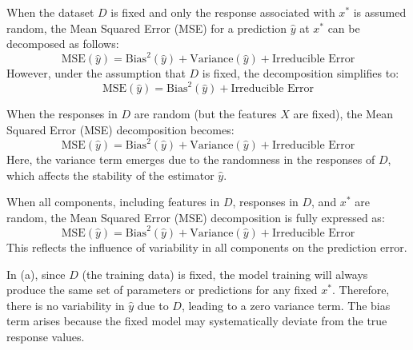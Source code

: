 \documentclass[12pt]{article}
\begin{document}
\begin{enumerate}

When the dataset \(D\) is fixed and only the response associated with \(x^*\) is assumed random, the Mean Squared Error (MSE) for a prediction \(\hat{y}\) at \(x^*\) can be decomposed as follows:
\[
\text{MSE}(\hat{y}) = \text{Bias}^2(\hat{y}) + \text{Variance}(\hat{y}) + \text{Irreducible Error}
\]
However, under the assumption that \(D\) is fixed, the decomposition simplifies to:
\[
\text{MSE}(\hat{y}) = \text{Bias}^2(\hat{y}) + \text{Irreducible Error}
\]



When the responses in \(D\) are random (but the features \(X\) are fixed), the Mean Squared Error (MSE) decomposition becomes:
\[
\text{MSE}(\hat{y}) = \text{Bias}^2(\hat{y}) + \text{Variance}(\hat{y}) + \text{Irreducible Error}
\]
Here, the variance term emerges due to the randomness in the responses of \(D\), which affects the stability of the estimator \(\hat{y}\).



When all components, including features in \(D\), responses in \(D\), and \(x^*\) are random, the Mean Squared Error (MSE) decomposition is fully expressed as:
\[
\text{MSE}(\hat{y}) = \text{Bias}^2(\hat{y}) + \text{Variance}(\hat{y}) + \text{Irreducible Error}
\]
This reflects the influence of variability in all components on the prediction error.


In (a), since \(D\) (the training data) is fixed, the model training will always produce the same set of parameters or predictions for any fixed \(x^*\). Therefore, there is no variability in \(\hat{y}\) due to \(D\), leading to a zero variance term. The bias term arises because the fixed model may systematically deviate from the true response values.


\end{enumerate}
\end{document}
